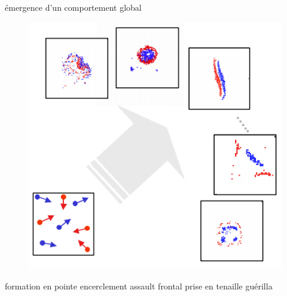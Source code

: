 \documentclass{article}
\begin{document}
émergence d'un comportement global
\begin{figure}[H]
	\begin{centering}
	\includegraphics[width=0.8\linewidth]{../ressources/einstein_global_behavior}
	\caption{}
	\end{centering}
\end{figure}
formation en pointe
encerclement
assault frontal
prise en tenaille
guérilla
\end{document}
